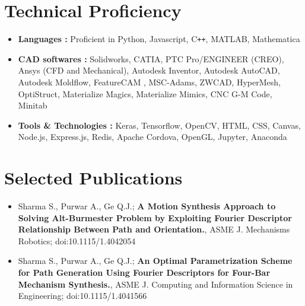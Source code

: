 \documentclass[letterpaper,10pt]{article}
\newcommand{\resumeSection}[1]{
\vspace{-12pt}
\section{\textbf{#1}}
}
\newcommand{\resumeItemListStart}{
\vspace{-7pt}
\begin{itemize}[leftmargin=14pt]
}
\newcommand{\resumeItemListEnd}{
\vspace{+7pt}
\end{itemize}
}
\newcommand{\resumeItem}[1]{
  \item\small{
      {#1 \vspace{-7pt}
      }
  }
}
\begin{document}
\resumeSection{Technical Proficiency}
	\vspace{+7pt}
	\resumeItemListStart
	\resumeItem{\textbf{Languages :} Proficient in Python, Javascript, C\texttt{++}, MATLAB, Mathematica}
	\resumeItem{\textbf{CAD softwares :} Solidworks, CATIA, PTC Pro/ENGINEER (CREO), Ansys (CFD and Mechanical), Autodesk Inventor, Autodesk AutoCAD, Autodesk Moldflow, FeatureCAM , MSC-Adams, ZWCAD, HyperMesh, OptiStruct, Materialize Magics, Materialize Mimics, CNC G-M Code, Minitab}
	\resumeItem{\textbf{Tools \& Technologies :} Keras, Tensorflow, OpenCV, HTML, CSS, Canvas, Node.js, Express.js, Redis, Apache Cordova, OpenGL, Jupyter, Anaconda}
	\resumeItemListEnd


\resumeSection{Selected Publications}
	\vspace{+7pt}
	\resumeItemListStart
	\resumeItem{Sharma S., Purwar A., Ge Q.J.; \textbf{A Motion Synthesis Approach to Solving Alt-Burmester Problem by Exploiting Fourier Descriptor Relationship Between Path and Orientation.}, ASME J. Mechanisms Robotics; doi:10.1115/1.4042054}
	\resumeItem{Sharma S., Purwar A., Ge Q.J.; \textbf{An Optimal Parametrization Scheme for Path Generation Using Fourier Descriptors for Four-Bar Mechanism Synthesis.}, ASME J. Computing and Information Science in Engineering; doi:10.1115/1.4041566}
	\resumeItemListEnd
\end{document}
